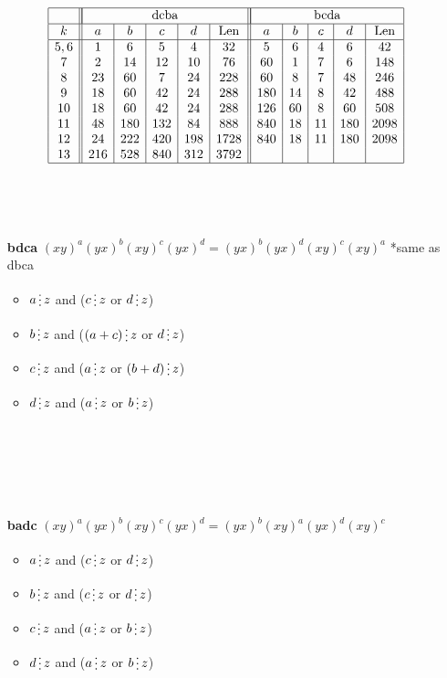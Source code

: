 \documentclass[utf8]{article}
\newcommand{\divisibleby}{\mathop{\raisebox{-2pt}{\vdots}}}
\begin{document}
\begin{itemize}
		\begin{table}[!htb]
			\arraycolsep=2pt
			$$
			\begin{array}{|c||c|c|c|c|c||c|c|c|c|c|}
			\hline
			&\multicolumn{5}{|c||}{\text{dcba}}&\multicolumn{5}{|c|}{\text{bcda}}\\
			\hline
			k&a&b&c&d&\text{Len}&a&b&c&d&\text{Len}\\
			\hline
			5,6&1&6&5&4&32&5&6&4&6&42\\
			7&2&14&12&10&76&60&1&7&6&148\\
			8&23&60&7&24&228&60&8&7&48&246\\
			9&18&60&42&24&288&180&14&8&42&488\\
			10&18&60&42&24&288&126&60&8&60&508\\
			11&48&180&132&84&888&840&18&11&180&2098\\
			12&24&222&420&198&1728&840&18&11&180&2098\\
			13&216&528&840&312&3792&&&&&\\
			\hline
			\end{array}
			$$
		\end{table}
		
		~
		
		~
		
		
		\item[\textbf{bdca}] $(xy)^a(yx)^b(xy)^c(yx)^d = (yx)^b(yx)^d(xy)^c(xy)^a$ *same as dbca
		\begin{itemize}
			\item $a \divisibleby z$ and ($c \divisibleby z$ or $d \divisibleby z$)
			\item $b \divisibleby z$ and ($(a+c) \divisibleby z$ or $d \divisibleby z$)
			\item $c \divisibleby z$ and ($a \divisibleby z$ or $(b+d) \divisibleby z$)
			\item $d \divisibleby z$ and ($a \divisibleby z$ or $b \divisibleby z$)
		\end{itemize}
		
				~
				
				~
				
				~
		
		\item[\textbf{badc}] $(xy)^a(yx)^b(xy)^c(yx)^d = (yx)^b(xy)^a(yx)^d(xy)^c$ 
		\begin{itemize}
			\item $a \divisibleby z$ and ($c \divisibleby z$ or $d \divisibleby z$)
			\item $b \divisibleby z$ and ($c \divisibleby z$ or $d \divisibleby z$)
			\item $c \divisibleby z$ and ($a \divisibleby z$ or $b \divisibleby z$)
			\item $d \divisibleby z$ and ($a \divisibleby z$ or $b \divisibleby z$)
		\end{itemize}
		

\end{itemize}
\end{document}
